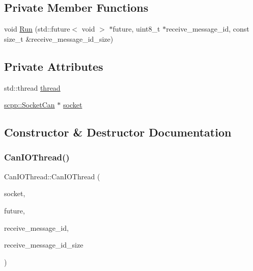 \subsection*{Private Member Functions}
\begin{DoxyCompactItemize}
\item 
void \hyperlink{classCanIOThread_a1dfe981584e3e558df59211571ac9860}{Run} (std\+::future$<$ void $>$ $\ast$future, uint8\+\_\+t $\ast$receive\+\_\+message\+\_\+id, const size\+\_\+t \&receive\+\_\+message\+\_\+id\+\_\+size)
\end{DoxyCompactItemize}
\subsection*{Private Attributes}
\begin{DoxyCompactItemize}
\item 
std\+::thread \hyperlink{classCanIOThread_a7a0b5ee8f944e3e94d529311f064c1ac}{thread}
\item 
\hyperlink{classscpp_1_1SocketCan}{scpp\+::\+Socket\+Can} $\ast$ \hyperlink{classCanIOThread_a4c0f06e7c73ea3afcb567ff7dbb41f30}{socket}
\end{DoxyCompactItemize}


\subsection{Constructor \& Destructor Documentation}
\mbox{\label{classCanIOThread_a5ab76331e5bd6ce26fcad85e8bd5d9f4}} 
\subsubsection{\texorpdfstring{Can\+I\+O\+Thread()}{CanIOThread()}}
{\footnotesize\ttfamily Can\+I\+O\+Thread\+::\+Can\+I\+O\+Thread (\begin{DoxyParamCaption}\item[{\hyperlink{classscpp_1_1SocketCan}{scpp\+::\+Socket\+Can} $\ast$}]{socket,  }\item[{std\+::future$<$ void $>$ $\ast$}]{future,  }\item[{uint8\+\_\+t $\ast$}]{receive\+\_\+message\+\_\+id,  }\item[{const size\+\_\+t \&}]{receive\+\_\+message\+\_\+id\+\_\+size }\end{DoxyParamCaption})}

